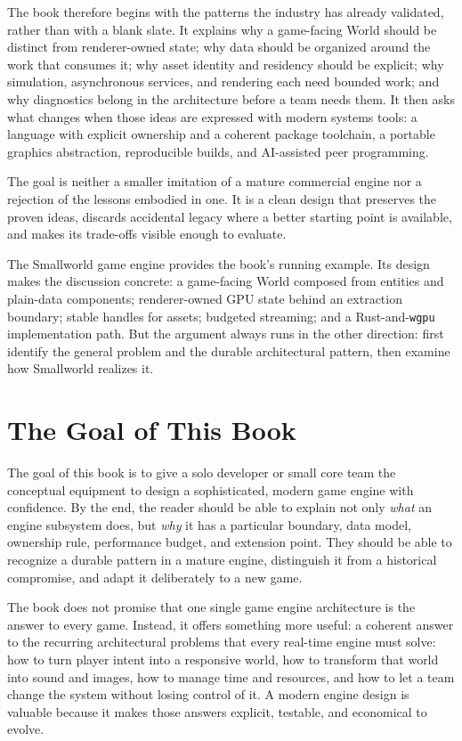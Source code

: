 \documentclass[
  11pt,
  letterpaper,
  DIV=11,
  numbers=noendperiod,
  twoside,
  open=right]{scrreprt}
\begin{document}
The book therefore begins with the patterns the industry has already
validated, rather than with a blank slate. It explains why a game-facing
World should be distinct from renderer-owned state; why data should be
organized around the work that consumes it; why asset identity and
residency should be explicit; why simulation, asynchronous services, and
rendering each need bounded work; and why diagnostics belong in the
architecture before a team needs them. It then asks what changes when
those ideas are expressed with modern systems tools: a language with
explicit ownership and a coherent package toolchain, a portable graphics
abstraction, reproducible builds, and AI-assisted peer programming.

The goal is neither a smaller imitation of a mature commercial engine
nor a rejection of the lessons embodied in one. It is a clean design
that preserves the proven ideas, discards accidental legacy where a
better starting point is available, and makes its trade-offs visible
enough to evaluate.

The Smallworld game engine provides the book's running example. Its
design makes the discussion concrete: a game-facing World composed from
entities and plain-data components; renderer-owned GPU state behind an
extraction boundary; stable handles for assets; budgeted streaming; and
a Rust-and-\texttt{wgpu} implementation path. But the argument always
runs in the other direction: first identify the general problem and the
durable architectural pattern, then examine how Smallworld realizes it.

\section*{The Goal of This Book}\label{the-goal-of-this-book}


The goal of this book is to give a solo developer or small core team the
conceptual equipment to design a sophisticated, modern game engine with
confidence. By the end, the reader should be able to explain not only
\emph{what} an engine subsystem does, but \emph{why} it has a particular
boundary, data model, ownership rule, performance budget, and extension
point. They should be able to recognize a durable pattern in a mature
engine, distinguish it from a historical compromise, and adapt it
deliberately to a new game.

The book does not promise that one single game engine architecture is
the answer to every game. Instead, it offers something more useful: a
coherent answer to the recurring architectural problems that every
real-time engine must solve: how to turn player intent into a responsive
world, how to transform that world into sound and images, how to manage
time and resources, and how to let a team change the system without
losing control of it. A modern engine design is valuable because it
makes those answers explicit, testable, and economical to evolve.
\end{document}
